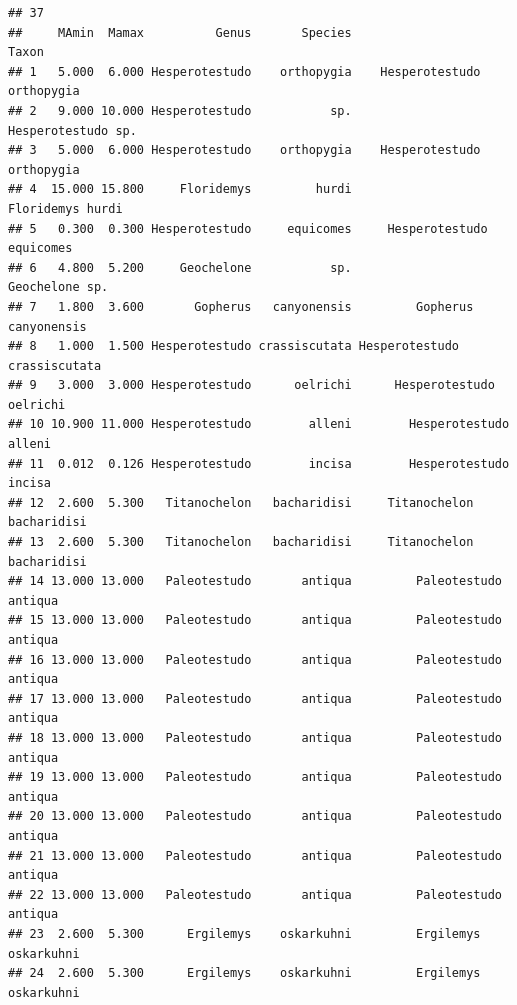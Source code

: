 \documentclass[]{article}
\begin{document}
\begin{verbatim}
## 37                                                                                                                                                                                                                                                                                                                                                                                                                                                                                                                                                                                                                                                                                                 
##     MAmin  Mamax          Genus       Species                        Taxon
## 1   5.000  6.000 Hesperotestudo    orthopygia    Hesperotestudo orthopygia
## 2   9.000 10.000 Hesperotestudo           sp.           Hesperotestudo sp.
## 3   5.000  6.000 Hesperotestudo    orthopygia    Hesperotestudo orthopygia
## 4  15.000 15.800     Floridemys         hurdi             Floridemys hurdi
## 5   0.300  0.300 Hesperotestudo     equicomes     Hesperotestudo equicomes
## 6   4.800  5.200     Geochelone           sp.               Geochelone sp.
## 7   1.800  3.600       Gopherus   canyonensis         Gopherus canyonensis
## 8   1.000  1.500 Hesperotestudo crassiscutata Hesperotestudo crassiscutata
## 9   3.000  3.000 Hesperotestudo      oelrichi      Hesperotestudo oelrichi
## 10 10.900 11.000 Hesperotestudo        alleni        Hesperotestudo alleni
## 11  0.012  0.126 Hesperotestudo        incisa        Hesperotestudo incisa
## 12  2.600  5.300   Titanochelon   bacharidisi     Titanochelon bacharidisi
## 13  2.600  5.300   Titanochelon   bacharidisi     Titanochelon bacharidisi
## 14 13.000 13.000   Paleotestudo       antiqua         Paleotestudo antiqua
## 15 13.000 13.000   Paleotestudo       antiqua         Paleotestudo antiqua
## 16 13.000 13.000   Paleotestudo       antiqua         Paleotestudo antiqua
## 17 13.000 13.000   Paleotestudo       antiqua         Paleotestudo antiqua
## 18 13.000 13.000   Paleotestudo       antiqua         Paleotestudo antiqua
## 19 13.000 13.000   Paleotestudo       antiqua         Paleotestudo antiqua
## 20 13.000 13.000   Paleotestudo       antiqua         Paleotestudo antiqua
## 21 13.000 13.000   Paleotestudo       antiqua         Paleotestudo antiqua
## 22 13.000 13.000   Paleotestudo       antiqua         Paleotestudo antiqua
## 23  2.600  5.300      Ergilemys    oskarkuhni         Ergilemys oskarkuhni
## 24  2.600  5.300      Ergilemys    oskarkuhni         Ergilemys oskarkuhni

\end{verbatim}
\end{document}
